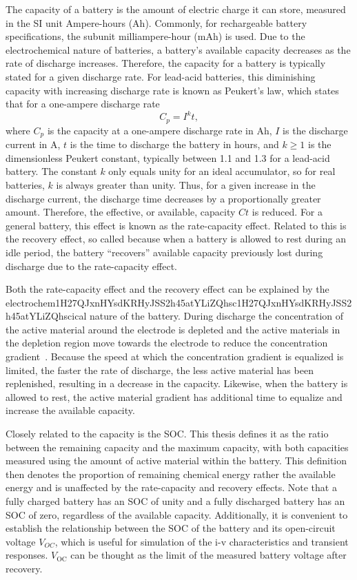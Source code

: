 \documentclass[../zhang_thesis.tex]{subfiles}
\begin{document}
The capacity of a battery is the amount of electric charge it can store, measured in the SI unit Ampere-hours (Ah). Commonly, for rechargeable battery specifications, the subunit milliampere-hour (mAh) is used. Due to the electrochemical nature of batteries, a battery's available capacity decreases as the rate of discharge increases. Therefore, the capacity for a battery is typically stated for a given discharge rate. For lead-acid batteries, this diminishing capacity with increasing discharge rate is known as Peukert's law, which states that for a one-ampere discharge rate~\cite{doerffel06}
\begin{equation}
C_p = I^k t,
\end{equation}
where $C_p$ is the capacity at a one-ampere discharge rate in Ah, $I$ is the discharge current in A, $t$ is the time to discharge the battery in hours, and $k\ge 1$ is the dimensionless Peukert constant, typically between 1.1 and 1.3 for a lead-acid battery. The constant $k$ only equals unity for an ideal accumulator, so for real batteries, $k$ is always greater than unity. Thus, for a given increase in the discharge current, the discharge time decreases by a proportionally greater amount. Therefore, the effective, or available, capacity $Ct$ is reduced. For a general battery, this effect is known as the rate-capacity effect. Related to this is the recovery effect, so called because when a battery is allowed to rest during an idle period, the battery ``recovers'' available capacity previously lost during discharge due to the rate-capacity effect.

Both the rate-capacity effect and the recovery effect can be explained by the electrochem1H27QJxnHYsdKRHyJSS2h45atYLiZQhsc1H27QJxnHYsdKRHyJSS2h45atYLiZQhscical nature of the battery. During discharge the concentration of the active material around the electrode is depleted and the active materials in the depletion region move towards the electrode to reduce the concentration gradient~\cite{chiasserini99}. Because the speed at which the concentration gradient is equalized is limited, the faster the rate of discharge, the less active material has been replenished, resulting in a decrease in the capacity. Likewise, when the battery is allowed to rest, the active material gradient has additional time to equalize and increase the available capacity.

Closely related to the capacity is the SOC. This thesis defines it as the ratio between the remaining capacity and the maximum capacity, with both capacities measured using the amount of active material within the battery. This definition then denotes the proportion of remaining chemical energy rather the available energy and is unaffected by the rate-capacity and recovery effects. Note that a fully charged battery has an SOC of unity and a fully discharged battery has an SOC of
zero, regardless of the available capacity. Additionally, it is convenient to establish the relationship between the SOC of the battery and its open-circuit voltage $V_{OC}$, which is useful for simulation of the i-v characteristics and transient responses. $V_\text{OC}$ can be thought as the limit of the measured battery voltage after recovery.
\end{document}
